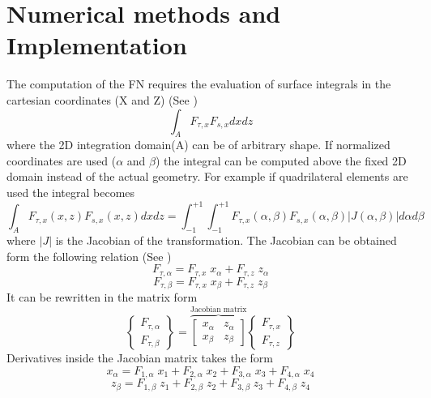 \documentclass[a4paper,12pt]{article}
\begin{document}
\section*{Numerical methods and Implementation}
\indent\indent\indent\indent The computation of the FN requires the evaluation of surface integrals in the cartesian coordinates (X and Z) (See \cite{carrera2014finite})
$$\int_{A}^{} F_{\tau,x} F_{s,x} dx dz $$ where the 2D integration domain(A) can be of arbitrary shape. If normalized coordinates are used ($\alpha$ and $\beta$)
the integral can be computed above the fixed 2D domain instead of the actual geometry. For example if quadrilateral elements are used the integral becomes $$ \int_{A}^{} F_{\tau,x}(x,z) F_{s,x}(x,z)dxdz = \int_{-1}^{+1}\int_{-1}^{+1} F_{\tau,x}(\alpha,\beta) F_{s,x}(\alpha,\beta) |J(\alpha,\beta)| d\alpha  d\beta$$ where $|J|$ is the Jacobian of the transformation. The Jacobian can be obtained form the following relation (See \cite{carrera2014finite}) $$ F_{\tau,\alpha} = F_{\tau,x}\;x_{\alpha} + F_{\tau,z}\; z_{\alpha}$$ $$F_{\tau,\beta} = F_{\tau,x}\;x_{\beta} + F_{\tau,z}\; z_{\beta}$$
It can be rewritten in the matrix form 
$$
\begin{Bmatrix}
F_{\tau,\alpha}\\
F_{\tau,\beta}   
\end{Bmatrix}
=
\overbrace{
\begin{bmatrix}
x_{\alpha} & z_{\alpha} \\
x_{\beta} & z_{\beta}
\end{bmatrix}
}^\text{Jacobian matrix}
\begin{Bmatrix}
F_{\tau,x}\\
F_{\tau,z}   
\end{Bmatrix}
$$
Derivatives inside the Jacobian matrix takes the form 
$$x_{\alpha} = F_{1 ,\alpha}\;x_{1} + F_{2 ,\alpha}\;x_{2} + F_{3 ,\alpha}\;x_{3} + F_{4 ,\alpha}\;x_{4}
$$ $$z_{\beta} = F_{1 ,\beta}\;z_{1} + F_{2 ,\beta}\;z_{2} + F_{3 ,\beta}\;z_{3} + F_{4 ,\beta}\;z_{4}$$\\
\end{document}
